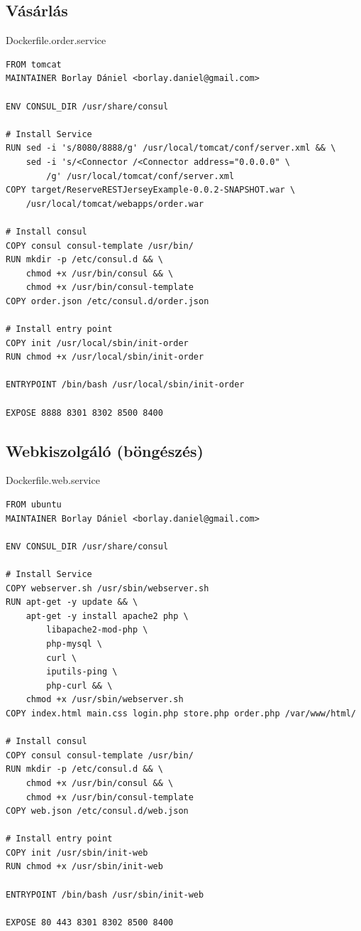 \documentclass[11pt,magyar,a4paper,twoside,]{report}
\begin{document}
\subsection{Vásárlás}\label{vuxe1suxe1rluxe1s}

Dockerfile.order.service

\begin{verbatim}
FROM tomcat
MAINTAINER Borlay Dániel <borlay.daniel@gmail.com>

ENV CONSUL_DIR /usr/share/consul

# Install Service
RUN sed -i 's/8080/8888/g' /usr/local/tomcat/conf/server.xml && \
    sed -i 's/<Connector /<Connector address="0.0.0.0" \
        /g' /usr/local/tomcat/conf/server.xml
COPY target/ReserveRESTJerseyExample-0.0.2-SNAPSHOT.war \
    /usr/local/tomcat/webapps/order.war

# Install consul
COPY consul consul-template /usr/bin/
RUN mkdir -p /etc/consul.d && \
    chmod +x /usr/bin/consul && \
    chmod +x /usr/bin/consul-template
COPY order.json /etc/consul.d/order.json

# Install entry point
COPY init /usr/local/sbin/init-order
RUN chmod +x /usr/local/sbin/init-order

ENTRYPOINT /bin/bash /usr/local/sbin/init-order

EXPOSE 8888 8301 8302 8500 8400
\end{verbatim}

\subsection{Webkiszolgáló
(böngészés)}\label{webkiszolguxe1luxf3-buxf6nguxe9szuxe9s}

Dockerfile.web.service

\begin{verbatim}
FROM ubuntu
MAINTAINER Borlay Dániel <borlay.daniel@gmail.com>

ENV CONSUL_DIR /usr/share/consul

# Install Service
COPY webserver.sh /usr/sbin/webserver.sh
RUN apt-get -y update && \
    apt-get -y install apache2 php \
        libapache2-mod-php \
        php-mysql \
        curl \
        iputils-ping \
        php-curl && \
    chmod +x /usr/sbin/webserver.sh
COPY index.html main.css login.php store.php order.php /var/www/html/

# Install consul
COPY consul consul-template /usr/bin/
RUN mkdir -p /etc/consul.d && \
    chmod +x /usr/bin/consul && \
    chmod +x /usr/bin/consul-template
COPY web.json /etc/consul.d/web.json

# Install entry point
COPY init /usr/sbin/init-web
RUN chmod +x /usr/sbin/init-web

ENTRYPOINT /bin/bash /usr/sbin/init-web

EXPOSE 80 443 8301 8302 8500 8400
\end{verbatim}
\end{document}
